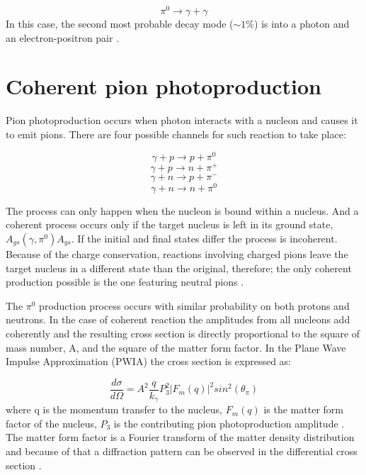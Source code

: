 \begin{equation}
\pi^{0} \rightarrow \gamma + \gamma
\end{equation}
In this case, the second most probable decay mode ($\sim1\%$) is into a photon and an electron-positron pair \cite{amsler}.

\section{Coherent pion photoproduction}

\indent Pion photoproduction occurs when photon interacts with a nucleon and causes it to emit pions. There are four possible channels for such reaction to take place:

\begin{equation}
\gamma + p \rightarrow p + \pi^{0}
\end{equation}
\begin{equation}
\gamma + p \rightarrow n + \pi^{+}
\end{equation}
\begin{equation}
\gamma + n \rightarrow p + \pi^{-}
\end{equation}
\begin{equation}
\gamma + n \rightarrow n + \pi^{0}
\end{equation}

The process can only happen when the nucleon is bound within a nucleus. And a coherent process occurs only if the target nucleus is left in its ground state, $A_{gs}(\gamma,\pi^{0})A_{gs}$. If the initial and final states differ the process is incoherent. Because of the charge conservation, reactions involving charged pions leave the target nucleus in a different state than the original, therefore; the only coherent production possible is the one featuring neutral pions \cite{claire}.

\indent The $\pi^{0}$ production process occurs with similar probability on both protons and neutrons. In the case of coherent reaction the amplitudes from all nucleons add coherently and the resulting cross section is directly proportional to the square of mass number, A, and the square of the matter form factor. In the Plane Wave Impulse Approximation (PWIA) the cross section is expressed as:

\begin{equation}
\frac{d\sigma}{d\Omega}=A^{2} \frac{q}{k_{\gamma}} P^{2}_{3} |F_{m}(q)|^{2} sin^{2}(\theta_{\pi})
\end{equation}
where q is the momentum transfer to the nucleus, $F_{m}(q)$ is the matter form factor of the nucleus, $P_{3}$ is the contributing pion photoproduction amplitude \cite{prop}. The matter form factor is a Fourier transform of the matter density distribution and because of that a diffraction pattern can be observed in the differential cross section \cite{claire}.

